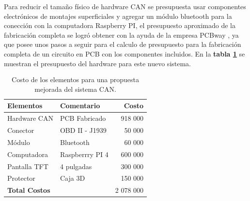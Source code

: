Para reducir el tamaño físico de hardware CAN se presupuesta usar componentes electrónicos de montajes superficiales y agregar un módulo bluetooth para la conección con la computadora Raspberry PI, el presupuesto aproximado de la fabricación completa se logró obtener con la ayuda de la empresa PCBway \cite{pcbway}, ya que posee unos pasos a seguir para el calculo de presupuesto para la fabricación completa de un circuito en PCB con los componentes incluidos. En la \textbf{tabla \ref{tabla:raspberri}} se muestran el presupuesto del hardware para este nuevo sistema.
\begin{table}[H]
\begin{center}
\begin{tabular}{|l|l|r|}
\hline
\textbf{Elementos} & \textbf{Comentario} & \textbf{Costo}  \\ \hline


Hardware CAN    & PCB Fabricado    & 918 000 \\ \hline
Conector        & OBD II - J1939     & 50 000 \\ \hline
Módulo          & Bluetooth          & 60 000 \\ \hline
Computadora     & Raspberrry PI 4    & 600 000 \\ \hline
Pantalla TFT    & 4 pulgadas         & 300 000 \\ \hline
Protector       & Caja 3D            & 150 000\\ \hline
\textbf{Total Costos}&  &2 078 000 \\ \hline



\end{tabular}
\caption{Costo de los elementos para una propuesta mejorada del sistema CAN.}
\label{tabla:raspberri}
\end{center}
\end{table}






